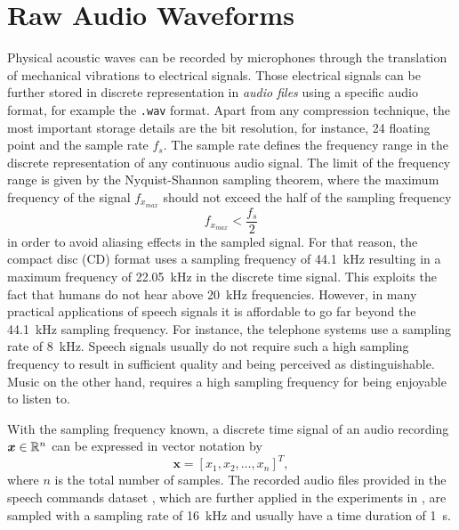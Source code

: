 
\section{Raw Audio Waveforms}\label{sec:signal_raw}
Physical acoustic waves can be recorded by microphones through the translation of mechanical vibrations to electrical signals. 
Those electrical signals can be further stored in discrete representation in \emph{audio files} using a specific audio format, for example the \texttt{.wav} format.
Apart from any compression technique, the most important storage details are the bit resolution, for instance, \SI{24}{\bit} floating point and the sample rate $f_s$.
The sample rate defines the frequency range in the discrete representation of any continuous audio signal.
The limit of the frequency range is given by the Nyquist-Shannon sampling theorem, where the maximum frequency of the signal $f_{x_{max}}$ should not exceed the half of the sampling frequency
\begin{equation}\label{eq:signal_raw_nyquist}
  f_{x_{max}} < \frac{f_s}{2}
\end{equation}
in order to avoid aliasing effects in the sampled signal.
For that reason, the compact disc (CD) format uses a sampling frequency of \SI{44.1}{\kilo\hertz} resulting in a maximum frequency of \SI{22.05}{\kilo\hertz} in the discrete time signal.
This exploits the fact that humans do not hear above \SI{20}{\kilo\hertz} frequencies.
However, in many practical applications of speech signals it is affordable to go far beyond the \SI{44.1}{\kilo\hertz} sampling frequency. 
For instance, the telephone systems use a sampling rate of \SI{8}{\kilo\hertz}.
Speech signals usually do not require such a high sampling frequency to result in sufficient quality and being perceived as distinguishable.
Music on the other hand, requires a high sampling frequency for being enjoyable to listen to.

With the sampling frequency known, a discrete time signal of an audio recording $\bm{x} \in \mathbb{R}^n$ can be expressed in vector notation by
\begin{equation}\label{eq:signal_raw_x}
  \bm{x} = [x_1, x_2, \dots, x_n]^T,
\end{equation}
where $n$ is the total number of samples.
The recorded audio files provided in the speech commands dataset \cite{Warden2018}, which are further applied in the experiments in , are sampled with a sampling rate of \SI{16}{\kilo\hertz} and usually have a time duration of \SI{1}{\second}.

